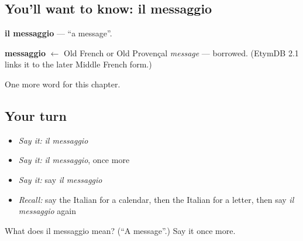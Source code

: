 \subsection*{You'll want to know: il messaggio}
\textbf{il messaggio} — \textquotedblleft{}a message\textquotedblright{}.

\begin{cousinweb}
\textbf{messaggio} $\leftarrow$ Old French or Old Provençal \emph{message} — borrowed. (EtymDB 2.1 links it to the later Middle French form.)
\end{cousinweb}

\begin{grammarlens}[title={What you've built}]
One more word for this chapter.
\end{grammarlens}

\subsection*{Your turn}
\begin{itemize}
\raggedright
  \item \emph{Say it:} \emph{il messaggio}
  \item \emph{Say it:} \emph{il messaggio}, once more
  \item \emph{Say it:} say \emph{il messaggio}
  \item \emph{Recall:} say the Italian for a calendar, then the Italian for a letter, then say \emph{il messaggio} again
\end{itemize}

\begin{tcolorbox}[breakable,colback=teal!4,colframe=teal!35!black,title={Before you move on}]
What does il messaggio mean? (\textquotedblleft{}A message\textquotedblright{}.) Say it once more.
\end{tcolorbox}

